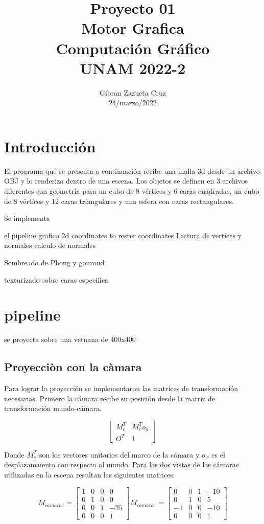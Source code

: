 \documentclass[12pt]{article}
\title{%
  Proyecto 01\\
  \large Motor Grafica \\
    \Large Computación Gráfico\\
     \large UNAM 2022-2}
\author{Gibran Zazueta Cruz \\
\small 24/marzo/2022}
\date{}
\begin{document}
\maketitle

\section{Introducción}

El programa que se presenta a continuación recibe una malla 3d desde un archivo OBJ y lo renderiza dentro de una escena. Los objetos se definen en 3 archivos diferentes con geometría para un cubo de 8 vértices y 6 caras cuadradas, un cubo de 8 vértices y 12 caras triangulares y una esfera con caras rectangulares.

Se implementa

el pipeline grafico 2d coordinates to rester coordinates
Lectura de vertices y normales
calculo de normales

Sombreado de Phong y gouroud

texturizado sobre caras especifica

\section{pipeline}

se proyecta sobre una vetnana de 400x400
\subsection{Proyecciòn con la càmara}

Para lograr la proyección se implementaron las matrices de transformación necesarias. Primero la cámara recibe su posición desde la matriz de transformación mundo-cámara.


\begin{equation}
\begin{bmatrix}
M_{c}^{T} &  M_{c}^{T}o_{w}\\
O^{T} & 1 

\end{bmatrix}
\end{equation} 

Donde $M_{c}^{T} $ son los vectores unitarios del marco de la cámara y $o_{w}$ es el desplazamaiento con respecto al mundo.
Para las dos vistas de las cámaras utilizadas en la escena resultan las siguientes matrices:

$$
M_{camara1}= \begin{bmatrix}
1 & 0 & 0& 0\\
0 & 1 & 0& 0\\
0 & 0 & 1&-25 \\
0 & 0 & 0&1
\end{bmatrix}
M_{camara1}= \begin{bmatrix}
0 & 0 & 1& -10\\
0 & 1 & 0& 5\\
-1 & 0 & 0&-10 \\
0 & 0 & 0&1
\end{bmatrix}
$$
\end{document}
